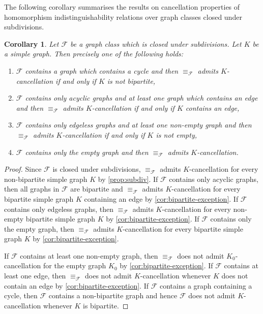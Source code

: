 \documentclass[3p,final]{elsarticle}
\newtheorem{corollary}[theorem]{Corollary}
\begin{document}
	The following corollary summarises the results on cancellation properties of homomorphism indistinguishability relations over graph classes closed under subdivisions.

	\begin{corollary}
		Let $\mathcal{F}$ be a graph class which is closed under subdivisions.
		Let $K$ be a simple graph.
		Then precisely one of the following holds:
		\begin{enumerate}
			\item $\mathcal{F}$ contains a graph which contains a cycle and then $\equiv_{\mathcal{F}}$ admits $K$-cancellation if and only if $K$ is not bipartite,
			\item $\mathcal{F}$ contains only acyclic graphs and at least one graph which contains an edge and then $\equiv_{\mathcal{F}}$ admits $K$-cancellation if and only if $K$ contains an edge,
			\item $\mathcal{F}$ contains only edgeless graphs and at least one non-empty graph and then $\equiv_{\mathcal{F}}$ admits $K$-cancellation if and only if $K$ is not empty,
			\item $\mathcal{F}$ contains only the empty graph and then $\equiv_{\mathcal{F}}$ admits $K$-cancellation.
		\end{enumerate}
	\end{corollary}
	\begin{proof}
		Since $\mathcal{F}$ is closed under subdivisions, $\equiv_{\mathcal{F}}$ admits $K$\nobreakdash-cancellation for every non-bipartite simple graph $K$ by \cref{prop:subdiv}.
		If $\mathcal{F}$ contains only acyclic graphs,
		then all graphs in $\mathcal{F}$ are bipartite and
		$\equiv_{\mathcal{F}}$ admits $K$\nobreakdash-cancellation for every bipartite simple graph $K$ containing an edge by \cref{cor:bipartite-exception}.
		If $\mathcal{F}$ contains only edgeless graphs,
		then $\equiv_{\mathcal{F}}$ admits $K$\nobreakdash-cancellation for every non-empty bipartite simple graph $K$ by \cref{cor:bipartite-exception}.
		If $\mathcal{F}$ contains only the empty graph,
		then $\equiv_{\mathcal{F}}$ admits $K$\nobreakdash-cancellation for every bipartite simple graph $K$ by \cref{cor:bipartite-exception}.
		
		If $\mathcal{F}$ contains at least one non-empty graph, then $\equiv_{\mathcal{F}}$ does not admit $K_0$\nobreakdash-cancellation for the empty graph $K_0$ by \cref{cor:bipartite-exception}.
		If $\mathcal{F}$ contains at least one edge, then $\equiv_{\mathcal{F}}$ does not admit $K$\nobreakdash-cancellation whenever $K$ does not contain an edge by \cref{cor:bipartite-exception}.
		If $\mathcal{F}$ contains a graph containing a cycle, then $\mathcal{F}$ contains a non-bipartite graph and hence $\mathcal{F}$ does not admit $K$\nobreakdash-cancellation whenever $K$ is bipartite.
	\end{proof}
\end{document}
